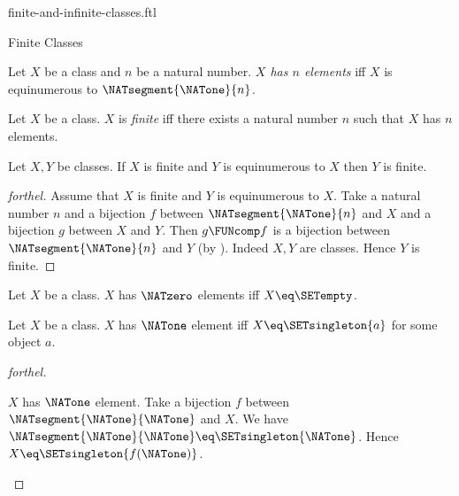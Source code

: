 \documentclass{naproche-library}
\begin{document}
\begin{smodule}[title=Finite and Infinite Classes]{finite-and-infinite-classes.ftl}

\begin{sfragment}{Finite Classes}
  \begin{definition}[forthel,id=FOUNDATIONS_14_3512046897512410]
    Let $X$ be a class and $n$ be a natural number.
    \emph{$X$ has $n$ elements} iff $X$ is equinumerous to $\NATsegment{\NATone}{n}$.
  \end{definition}

  \begin{definition}[forthel,id=FOUNDATIONS_14_3694156977274880]
    Let $X$ be a class.
    $X$ is \emph{finite} iff there exists a natural number $n$ such that $X$ has $n$ elements.
  \end{definition}

  \begin{proposition}[forthel,id=FOUNDATIONS_14_3929085203972096]
    Let $X, Y$ be classes.
    If $X$ is finite and $Y$ is equinumerous to $X$ then $Y$ is finite.
  \end{proposition}
  \begin{proof}[forthel]
    Assume that $X$ is finite and $Y$ is equinumerous to $X$.
    Take a natural number $n$ and a bijection $f$ between $\NATsegment{\NATone}{n}$ and $X$ and a bijection $g$ between $X$ and $Y$.
    Then $g \FUNcomp f$ is a bijection between $\NATsegment{\NATone}{n}$ and $Y$ (by ).
    Indeed $X, Y$ are classes.
    Hence $Y$ is finite.
  \end{proof}

  \begin{proposition}[forthel,id=FOUNDATIONS_14_5132547854597502]
    Let $X$ be a class.
    $X$ has $\NATzero$ elements iff $X \eq \SETempty$.
  \end{proposition}

  \begin{proposition}[forthel,id=FOUNDATIONS_14_6812054297034125]
    Let $X$ be a class.
    $X$ has $\NATone$ element iff $X \eq \SETsingleton{a}$ for some object $a$.
  \end{proposition}
  \begin{proof}[forthel]
    \begin{case}{$X$ has $\NATone$ element.}
      Take a bijection $f$ between $\NATsegment{\NATone}{\NATone}$ and $X$.
      We have $\NATsegment{\NATone}{\NATone} \eq \SETsingleton{\NATone}$.
      Hence $X \eq \SETsingleton{f(\NATone)}$.
    \end{case}


\end{proof}
\end{sfragment}
\end{smodule}
\end{document}
